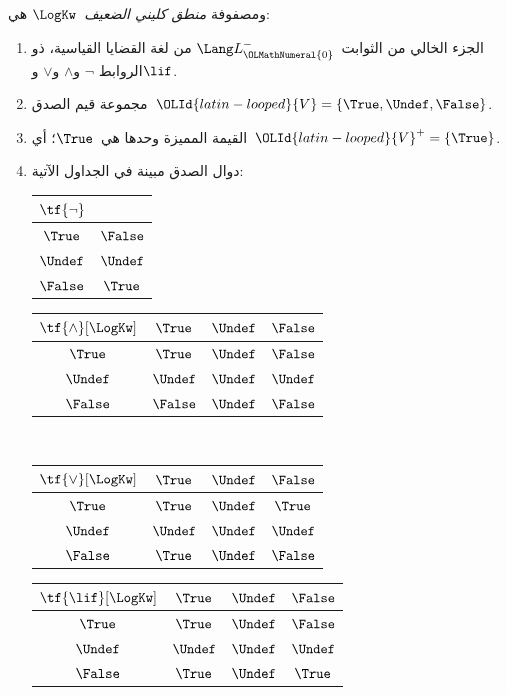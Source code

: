 \documentclass[../../../include/open-logic-section]{subfiles}
\begin{document}
\begin{defn}
ومصفوفة \emph{منطق كليني الضعيف}~$\LogKw$ هي:
\begin{enumerate}
  \item الجزء الخالي من الثوابت~$\Lang L_{\OLMathNumeral{0}}^{-}$ من لغة القضايا القياسية، ذو الروابط
  $\lnot$ و$\land$ و$\lor$ و$\lif$.
  \item مجموعة قيم الصدق~${\OLId{latin-looped}{V}} = \{\True, \Undef, \False\}$.
  \item القيمة المميزة وحدها هي~$\True$؛ أي~${\OLId{latin-looped}{V}}^+ = \{\True\}$.
  \item دوال الصدق مبينة في الجداول الآتية:
  \begin{center}
    \begin{tabular}{c|c}
      $\tf{\lnot}$ & \\
      \hline
      $\True$ & $\False$ \\
      $\Undef$ & $\Undef$ \\
      $\False$ & $\True$
    \end{tabular}
    \quad
    \begin{tabular}{c|ccc}
      $\tf{\land}[\LogKw]$ & $\True$ & $\Undef$ & $\False$ \\
      \hline
      $\True$ & $\True$ & $\Undef$ & $\False$ \\
      $\Undef$ & $\Undef$ & $\Undef$ & $\Undef$\\
      $\False$ & $\False$ & $\Undef$ & $\False$
    \end{tabular}
    \\[2ex]
    \begin{tabular}{c|ccc}
      $\tf{\lor}[\LogKw]$ & $\True$ & $\Undef$ & $\False$ \\
      \hline
      $\True$ & $\True$ & $\Undef$ & $\True$ \\
      $\Undef$ & $\Undef$ & $\Undef$ & $\Undef$ \\
      $\False$ & $\True$ & $\Undef$ & $\False$
    \end{tabular}
    \quad
    \begin{tabular}{c|ccc}
      $\tf{\lif}[\LogKw]$ & $\True$ & $\Undef$ & $\False$ \\
      \hline
      $\True$ & $\True$ & $\Undef$ & $\False$ \\
      $\Undef$ & $\Undef$ & $\Undef$ & $\Undef$  \\
      $\False$ & $\True$ & $\Undef$ & $\True$
    \end{tabular}
  \end{center}
\end{enumerate}
\end{defn}
\end{document}
